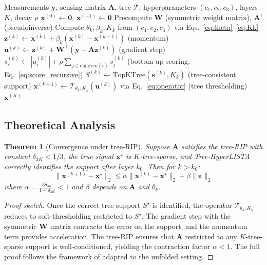 \documentclass{article}
\newtheorem{theorem}{Theorem}
\begin{document}
\begin{algorithm}[H]
\caption{Tree-HyperLISTA (Hybrid Mode)}
\label{alg:tree_hyperlista}
\begin{algorithmic}[1]
\REQUIRE Measurements $\mathbf{y}$, sensing matrix $\mathbf{A}$, tree $\mathcal{T}$, hyperparameters $(c_1, c_2, c_3)$, layers $K$, decay $\rho$
\STATE $\mathbf{x}^{(0)} \leftarrow \mathbf{0}$, $\mathbf{x}^{(-1)} \leftarrow \mathbf{0}$
\STATE Precompute $\mathbf{W}$ (symmetric weight matrix), $\mathbf{A}^\dagger$ (pseudoinverse)
    \STATE Compute $\theta_k, \beta_k, K_k$ from $(c_1, c_2, c_3)$ via Eqs.~\eqref{eq:theta}--\eqref{eq:Kk}
    \STATE $\mathbf{z}^{(k)} \leftarrow \mathbf{x}^{(k)} + \beta_k(\mathbf{x}^{(k)} - \mathbf{x}^{(k-1)})$ \hfill (momentum)
    \STATE $\mathbf{u}^{(k)} \leftarrow \mathbf{z}^{(k)} + \mathbf{W}^\top(\mathbf{y} - \mathbf{A}\mathbf{z}^{(k)})$ \hfill (gradient step)
    \STATE $s_i^{(k)} \leftarrow |u_i^{(k)}| + \rho \sum_{j \in \mathrm{children}(i)} s_j^{(k)}$ \hfill (bottom-up scoring, Eq.~\ref{eq:score_recursive})
    \STATE $S^{(k)} \leftarrow \mathrm{TopKTree}(\mathbf{s}^{(k)}, K_k)$ \hfill (tree-consistent support)
    \STATE $\mathbf{x}^{(k+1)} \leftarrow \mathcal{T}_{\theta_k, K_k}(\mathbf{u}^{(k)})$ via Eq.~\eqref{eq:operator} \hfill (tree thresholding)
\ENDFOR
\RETURN $\mathbf{x}^{(K)}$
\end{algorithmic}
\end{algorithm}

\subsection{Theoretical Analysis}

\begin{theorem}[Convergence under tree-RIP]
Suppose $\mathbf{A}$ satisfies the tree-RIP with constant $\delta_{3K} < 1/3$, the true signal $\mathbf{x}^\star$ is $K$-tree-sparse, and Tree-HyperLISTA correctly identifies the support after layer $k_0$. Then for $k > k_0$:
\begin{equation}
    \|\mathbf{x}^{(k+1)} - \mathbf{x}^\star\|_2 \leq \alpha \|\mathbf{x}^{(k)} - \mathbf{x}^\star\|_2 + \beta \|\boldsymbol{\varepsilon}\|_2
\end{equation}
where $\alpha = \frac{3\delta_{3K}}{1-\delta_{3K}} < 1$ and $\beta$ depends on $\mathbf{A}$ and $\theta_k$.
\end{theorem}

\begin{proof}[Proof sketch]
Once the correct tree support $S^\star$ is identified, the operator $\mathcal{T}_{\theta_k, K_k}$ reduces to soft-thresholding restricted to $S^\star$. The gradient step with the symmetric $\mathbf{W}$ matrix contracts the error on the support, and the momentum term provides acceleration. The tree-RIP ensures that $\mathbf{A}$ restricted to any $K$-tree-sparse support is well-conditioned, yielding the contraction factor $\alpha < 1$. The full proof follows the framework of \cite{baraniuk2010model} adapted to the unfolded setting.
\end{proof}
\end{document}
